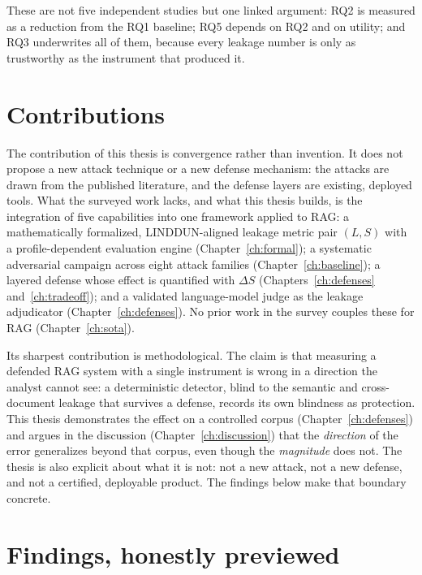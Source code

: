 These are not five independent studies but one linked argument: RQ2 is measured as a reduction
from the RQ1 baseline; RQ5 depends on RQ2 and on utility; and RQ3 underwrites all of them,
because every leakage number is only as trustworthy as the instrument that produced it.

\section{Contributions}
\label{sec:intro-contrib}

The contribution of this thesis is convergence rather than invention. It does not propose a new
attack technique or a new defense mechanism: the attacks are drawn from the published literature,
and the defense layers are existing, deployed tools. What the surveyed work lacks, and what this
thesis builds, is the integration of five capabilities into one framework applied to RAG: a
mathematically formalized, LINDDUN-aligned leakage metric pair $(L,S)$ with a profile-dependent
evaluation engine (Chapter~\ref{ch:formal}); a systematic adversarial campaign across eight attack
families (Chapter~\ref{ch:baseline}); a layered defense whose effect is quantified with $\Delta S$
(Chapters~\ref{ch:defenses} and~\ref{ch:tradeoff}); and a validated language-model judge as the
leakage adjudicator (Chapter~\ref{ch:defenses}). No prior work in the survey couples these for RAG
(Chapter~\ref{ch:sota}).

Its sharpest contribution is methodological. The claim is that measuring a defended RAG system with
a single instrument is wrong in a direction the analyst cannot see: a deterministic detector, blind
to the semantic and cross-document leakage that survives a defense, records its own blindness as
protection. This thesis demonstrates the effect on a controlled corpus (Chapter~\ref{ch:defenses})
and argues in the discussion (Chapter~\ref{ch:discussion}) that the \emph{direction} of the error
generalizes beyond that corpus, even though the \emph{magnitude} does not. The thesis is also
explicit about what it is not: not a new attack, not a new defense, and not a certified, deployable
product. The findings below make that boundary concrete.

\section{Findings, honestly previewed}
\label{sec:intro-findings}


